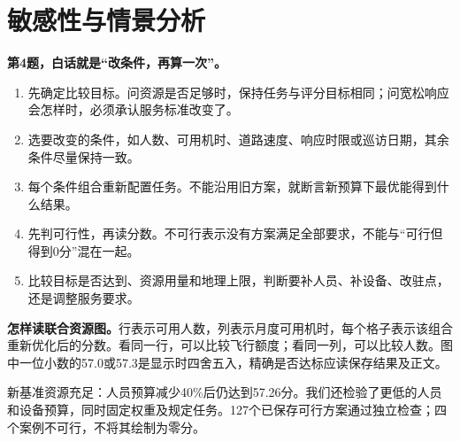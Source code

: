 \documentclass[12pt,a4paper]{article}
\numberwithin{equation}{section}
\begin{document}
\section{敏感性与情景分析}
\noindent\textbf{第4题，白话就是“改条件，再算一次”。}
\begin{enumerate}
\item 先确定比较目标。问资源是否足够时，保持任务与评分目标相同；问宽松响应会怎样时，必须承认服务标准改变了。
\item 选要改变的条件，如人数、可用机时、道路速度、响应时限或巡访日期，其余条件尽量保持一致。
\item 每个条件组合重新配置任务。不能沿用旧方案，就断言新预算下最优能得到什么结果。
\item 先判可行性，再读分数。不可行表示没有方案满足全部要求，不能与“可行但得到0分”混在一起。
\item 比较目标是否达到、资源用量和地理上限，判断要补人员、补设备、改驻点，还是调整服务要求。
\end{enumerate}
\noindent\textbf{怎样读联合资源图。}行表示可用人数，列表示月度可用机时，每个格子表示该组合重新优化后的分数。看同一行，可以比较飞行额度；看同一列，可以比较人数。图中一位小数的57.0或57.3是显示时四舍五入，精确是否达标应读保存结果及正文。

新基准资源充足：人员预算减少40\%后仍达到57.26分。我们还检验了更低的人员和设备预算，同时固定权重及规定任务。127个已保存可行方案通过独立检查；四个案例不可行，不将其绘制为零分。
\end{document}
